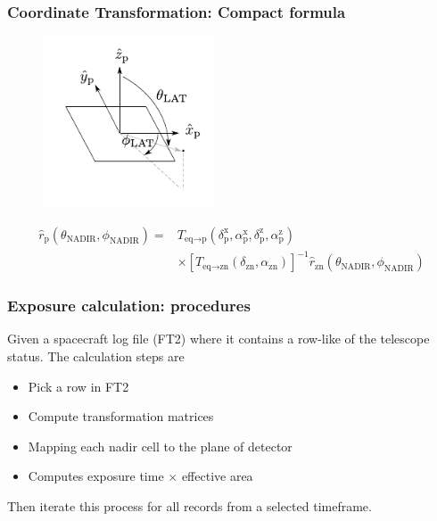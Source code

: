 \documentclass{beamer}
\begin{document}
\begin{frame}\frametitle{Coordinate Transformation: Compact formula}
  \begin{figure}[h!]
    \centering
    \includegraphics[width=0.45\textwidth]{figure/fig_coordinate/coord_plane_v2.pdf}
  \end{figure}
  \begin{equation*}
  \begin{split}
    \hat{r}_\text{p} (\theta_\text{NADIR}, \phi_\text{NADIR}) = & T_{\text{eq}\rightarrow\text{p}} (\delta^\text{x}_\text{p}, \alpha^\text{x}_\text{p}, \delta^\text{z}_\text{p}, \alpha^\text{z}_\text{p}) \\
    & \times \left[T_{\text{eq}\rightarrow\text{zn}} (\delta_\text{zn}, \alpha_\text{zn})\right]^{-1} \hat{r}_\text{zn} (\theta_\text{NADIR}, \phi_\text{NADIR})
  \end{split}
  \end{equation*}
\end{frame}

\begin{frame}\frametitle{Exposure calculation: procedures}
Given a spacecraft log file (FT2) where it contains a row-like 
of the telescope status. The calculation steps are
  \begin{itemize}
    \item Pick a row in FT2
    \item Compute transformation matrices
    \item Mapping each nadir cell to the plane of detector
    \item Computes exposure time $\times$ effective area
  \end{itemize}

Then iterate this process for all records from a selected timeframe.
\end{frame}
\end{document}
